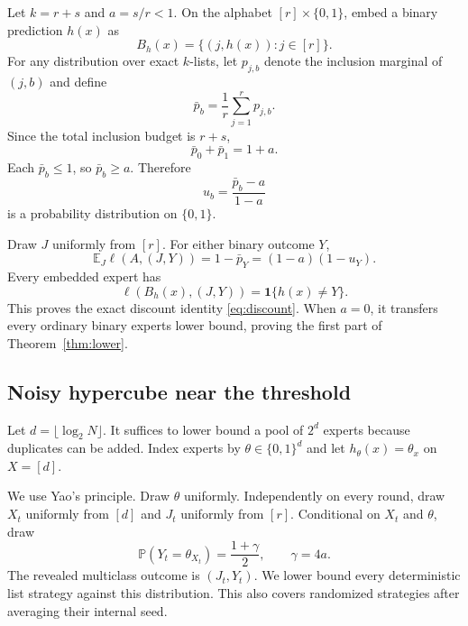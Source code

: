 \documentclass{article}
\theoremstyle{definition}
\theoremstyle{remark}
\newcommand{\E}{\mathbb E}
\newcommand{\Pp}{\mathbb P}
\newcommand{\1}{\mathbf 1}
\begin{document}
Let \(k=r+s\) and \(a=s/r<1\). On the alphabet \([r]\times\{0,1\}\), embed a binary prediction \(h(x)\) as \[ B_h(x)=\{(j,h(x)):j\in[r]\}. \] For any distribution over exact \(k\)-lists, let \(p_{j,b}\) denote the inclusion marginal of \((j,b)\) and define \[ \bar p_b=\frac1r\sum_{j=1}^rp_{j,b}. \] Since the total inclusion budget is \(r+s\), \[ \bar p_0+\bar p_1=1+a. \] Each \(\bar p_b\le1\), so \(\bar p_b\ge a\). Therefore \[ u_b=\frac{\bar p_b-a}{1-a} \] is a probability distribution on \(\{0,1\}\).

Draw \(J\) uniformly from \([r]\). For either binary outcome \(Y\), \[ \E_J\ell(A,(J,Y)) =1-\bar p_Y =(1-a)(1-u_Y). \] Every embedded expert has \[ \ell(B_h(x),(J,Y))=\1\{h(x)\ne Y\}. \] This proves the exact discount identity \eqref{eq:discount}. When \(a=0\), it transfers every ordinary binary experts lower bound, proving the first part of Theorem~\ref{thm:lower}.

\subsection{Noisy hypercube near the threshold}

Let \(d=\lfloor\log_2N\rfloor\). It suffices to lower bound a pool of \(2^d\) experts because duplicates can be added. Index experts by \(\theta\in\{0,1\}^d\) and let \(h_\theta(x)=\theta_x\) on \(X=[d]\).

We use Yao's principle. Draw \(\theta\) uniformly. Independently on every round, draw \(X_t\) uniformly from \([d]\) and \(J_t\) uniformly from \([r]\). Conditional on \(X_t\) and \(\theta\), draw \[ \Pp(Y_t=\theta_{X_t})=\frac{1+\gamma}{2}, \qquad \gamma=4a. \] The revealed multiclass outcome is \((J_t,Y_t)\). We lower bound every deterministic list strategy against this distribution. This also covers randomized strategies after averaging their internal seed.
\end{document}
